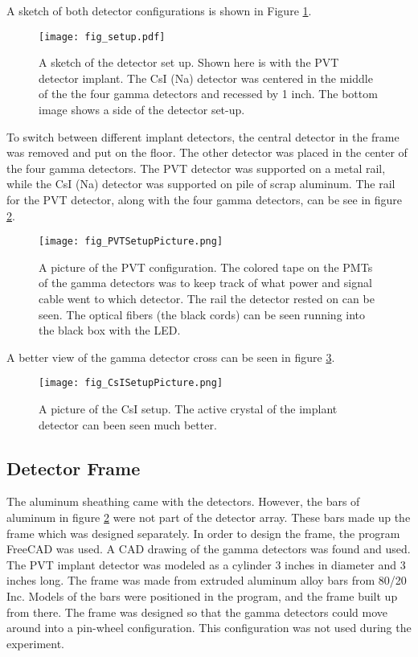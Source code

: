 \documentclass[main.tex]{subfiles}
\begin{document}
A sketch of both detector configurations is shown in Figure \ref{fig:detsketch}.

\begin{figure}
	\centerline{\texttt{[image: fig\_setup.pdf]}}
	\caption{A sketch of the detector set up. 
	Shown here is with the PVT detector implant.
	The CsI (Na) detector was centered in the middle of the the four gamma detectors and recessed by 1 inch.
	The bottom image shows a side of the detector set-up.}
	\label{fig:detsketch}
\end{figure}

To switch between different implant detectors, the central detector in the frame was removed and put on the floor.
The other detector was placed in the center of the four gamma detectors.
The PVT detector was supported on a metal rail, while the CsI (Na) detector was supported on pile of scrap aluminum.
The rail for the PVT detector, along with the four gamma detectors,  can be see in figure \ref{fig:PVTPicture}.

\begin{figure}
	\centerline{\texttt{[image: fig\_PVTSetupPicture.png]}}
	\caption{A picture of the PVT configuration. 
		 The colored tape on the PMTs of the gamma detectors was to keep track of what power and signal cable went to which detector.
		 The rail the detector rested on can be seen.
		 The optical fibers (the black cords) can be seen running into the black box with the LED.
		 }
	\label{fig:PVTPicture}
\end{figure}

A better view of the gamma detector cross can be seen in figure \ref{fig:CsIPicture}.

\begin{figure}
	\centerline{\texttt{[image: fig\_CsISetupPicture.png]}}
	\caption{A picture of the CsI setup.
		 The active crystal of the implant detector can been seen much better. 
		 }
	\label{fig:CsIPicture}
\end{figure}

\subsection{Detector Frame}
The aluminum sheathing came with the detectors.
However, the bars of aluminum in figure \ref{fig:PVTPicture} were not part of the detector array.
These bars made up the frame which was designed separately.
In order to design the frame, the program FreeCAD was used.
A CAD drawing of the gamma detectors was found and used.
The PVT implant detector was modeled as a cylinder 3 inches in diameter and 3 inches long.
The frame was made from extruded aluminum alloy bars from 80/20 Inc.
Models of the bars were positioned in the program, and the frame built up from there.
The frame was designed so that the gamma detectors could move around into a pin-wheel configuration.
This configuration was not used during the experiment.
\end{document}
